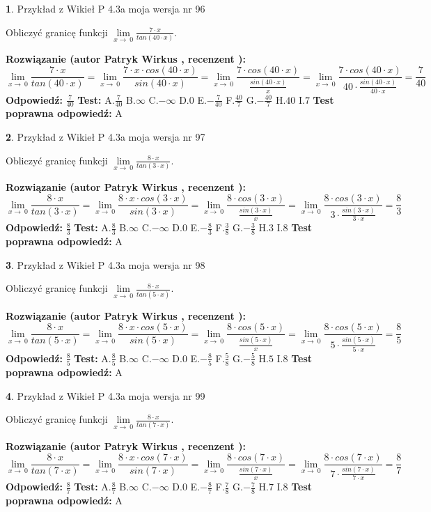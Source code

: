 \documentclass[12pt, a4paper]{article}
\theoremstyle{definition} %
\newtheorem{zad}{}
\newcommand{\zadStart}[1]{\begin{zad}#1\newline}
\newcommand{\zadStop}{\end{zad}}
\newcommand{\rozwStart}[2]{\noindent \textbf{Rozwiązanie (autor #1 , recenzent #2): }\newline}
\newcommand{\rozwStop}{\newline}
\newcommand{\odpStart}{\noindent \textbf{Odpowiedź:}\newline}
\newcommand{\odpStop}{\newline}
\newcommand{\testStart}{\noindent \textbf{Test:}\newline}
\newcommand{\testStop}{\newline}
\newcommand{\kluczStart}{\noindent \textbf{Test poprawna odpowiedź:}\newline}
\newcommand{\kluczStop}{\newline}
\begin{document}
\zadStart{Przykład z Wikieł P 4.3a moja wersja nr 96}


Obliczyć granicę funkcji $\lim\limits_{x\to\ 0}\frac{7 \cdot x}{tan(40 \cdot x)}$.
\zadStop
\rozwStart{Patryk Wirkus}{}
$$\lim\limits_{x\to\ 0}\frac{7 \cdot x}{tan(40 \cdot x)}=\lim\limits_{x\to\ 0}\frac{7 \cdot x \cdot cos(40 \cdot x)}{sin(40 \cdot x)}=\lim\limits_{x\to\ 0}\frac{7 \cdot cos(40 \cdot x)}{\frac{sin(40 \cdot x)}{x}}=\lim\limits_{x\to\ 0}\frac{7 \cdot cos(40 \cdot x)}{40 \cdot \frac{sin(40 \cdot x)}{40 \cdot x}} = \frac{7}{40}$$
\rozwStop
\odpStart
$\frac{7}{40}$
\odpStop
\testStart
A.$\frac{7}{40}$
B.$\infty$
C.$-\infty$
D.$0$
E.$-\frac{7}{40}$
F.$\frac{40}{7}$
G.$-\frac{40}{7}$
H.$40$
I.$7$
\testStop
\kluczStart
A
\kluczStop



\zadStart{Przykład z Wikieł P 4.3a moja wersja nr 97}


Obliczyć granicę funkcji $\lim\limits_{x\to\ 0}\frac{8 \cdot x}{tan(3 \cdot x)}$.
\zadStop
\rozwStart{Patryk Wirkus}{}
$$\lim\limits_{x\to\ 0}\frac{8 \cdot x}{tan(3 \cdot x)}=\lim\limits_{x\to\ 0}\frac{8 \cdot x \cdot cos(3 \cdot x)}{sin(3 \cdot x)}=\lim\limits_{x\to\ 0}\frac{8 \cdot cos(3 \cdot x)}{\frac{sin(3 \cdot x)}{x}}=\lim\limits_{x\to\ 0}\frac{8 \cdot cos(3 \cdot x)}{3 \cdot \frac{sin(3 \cdot x)}{3 \cdot x}} = \frac{8}{3}$$
\rozwStop
\odpStart
$\frac{8}{3}$
\odpStop
\testStart
A.$\frac{8}{3}$
B.$\infty$
C.$-\infty$
D.$0$
E.$-\frac{8}{3}$
F.$\frac{3}{8}$
G.$-\frac{3}{8}$
H.$3$
I.$8$
\testStop
\kluczStart
A
\kluczStop



\zadStart{Przykład z Wikieł P 4.3a moja wersja nr 98}


Obliczyć granicę funkcji $\lim\limits_{x\to\ 0}\frac{8 \cdot x}{tan(5 \cdot x)}$.
\zadStop
\rozwStart{Patryk Wirkus}{}
$$\lim\limits_{x\to\ 0}\frac{8 \cdot x}{tan(5 \cdot x)}=\lim\limits_{x\to\ 0}\frac{8 \cdot x \cdot cos(5 \cdot x)}{sin(5 \cdot x)}=\lim\limits_{x\to\ 0}\frac{8 \cdot cos(5 \cdot x)}{\frac{sin(5 \cdot x)}{x}}=\lim\limits_{x\to\ 0}\frac{8 \cdot cos(5 \cdot x)}{5 \cdot \frac{sin(5 \cdot x)}{5 \cdot x}} = \frac{8}{5}$$
\rozwStop
\odpStart
$\frac{8}{5}$
\odpStop
\testStart
A.$\frac{8}{5}$
B.$\infty$
C.$-\infty$
D.$0$
E.$-\frac{8}{5}$
F.$\frac{5}{8}$
G.$-\frac{5}{8}$
H.$5$
I.$8$
\testStop
\kluczStart
A
\kluczStop



\zadStart{Przykład z Wikieł P 4.3a moja wersja nr 99}


Obliczyć granicę funkcji $\lim\limits_{x\to\ 0}\frac{8 \cdot x}{tan(7 \cdot x)}$.
\zadStop
\rozwStart{Patryk Wirkus}{}
$$\lim\limits_{x\to\ 0}\frac{8 \cdot x}{tan(7 \cdot x)}=\lim\limits_{x\to\ 0}\frac{8 \cdot x \cdot cos(7 \cdot x)}{sin(7 \cdot x)}=\lim\limits_{x\to\ 0}\frac{8 \cdot cos(7 \cdot x)}{\frac{sin(7 \cdot x)}{x}}=\lim\limits_{x\to\ 0}\frac{8 \cdot cos(7 \cdot x)}{7 \cdot \frac{sin(7 \cdot x)}{7 \cdot x}} = \frac{8}{7}$$
\rozwStop
\odpStart
$\frac{8}{7}$
\odpStop
\testStart
A.$\frac{8}{7}$
B.$\infty$
C.$-\infty$
D.$0$
E.$-\frac{8}{7}$
F.$\frac{7}{8}$
G.$-\frac{7}{8}$
H.$7$
I.$8$
\testStop
\kluczStart
A
\kluczStop
\end{document}
